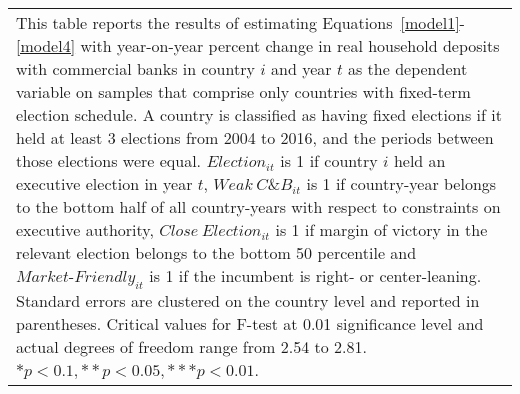 \begin{longtable}{m{4.5cm}*{12}{c}}
\bottomrule                                          \multicolumn{13}{m{\linewidth}}{\footnotesize This table reports the results of estimating Equations~\eqref{model1}-\eqref{model4} with year-on-year percent change in real household deposits with commercial banks in country $ i $ and year $ t $ as the dependent variable on samples that comprise only countries with fixed-term election schedule. A country is classified as having fixed elections if it held at least 3 elections from 2004 to 2016, and the periods between those elections were equal. $ Election_{it} $ is 1 if country $ i $ held an executive election in year $ t $, $ Weak\ C\&B_{it} $ is 1 if country-year belongs to the bottom half of all country-years with respect to constraints on executive authority, $ Close\ Election_{it} $ is 1 if margin of victory in the relevant election belongs to the bottom 50 percentile and  $ Market\text{-}Friendly_{it} $ is 1 if the incumbent is right- or center-leaning. Standard errors are clustered on the country level and reported in parentheses. Critical values for F-test at 0.01 significance level and actual degrees of freedom range from 2.54 to 2.81. \( * p<0.1, ** p<0.05, *** p<0.01 \). }\\                                          \end{longtable}
